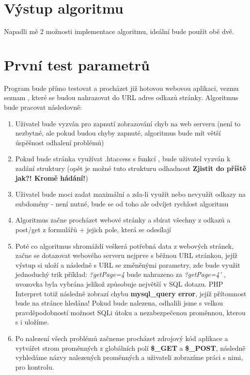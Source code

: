 \documentclass[12pt, a4paper]{report}
\begin{document}
\section{Výstup algoritmu}

Napadli mě 2 možnosti implementace algoritmu, ideální bude použít obě dvě.
\section{První test parametrů}
Program bude přímo testovat a procházet již hotovou webovou aplikaci, vezmu seznam , které se budou nahrazovat do URL adres odkazů stránky. Algoritmus bude pracovat následovně:
\begin{enumerate}
\item Uživatel bude vyzván pro zapnutí zobrazování chyb na web serveru (není to nezbytné, ale pokud budou chyby zapnuté, algoritmus bude mít větší úspěšnost odhalení problémů)
\item Pokud bude stránka využívat .htaccess s funkcí , bude uživatel vyzván k zadání struktury (opět je možné tuto strukturu odhadnout \textbf{Zjistit do příště jak?! Kromě hádání!})
\item Uživatel bude moci zadat maximální  a zda-li využít nebo nevyužít odkazy na subdomény - není nutné, bude se od toho ale odvíjet rychlost algoritmu
\item Algoritmus začne procházet webové stránky a sbírat všechny  z odkazů a post/get z formulářů + jejich pole, která se odesílají
\item Poté co algoritmus shromáždí veškerá potřebná data z webových stránek, začne se dotazovat webového serveru nejprve s běžnou URL stránkou, jejíž výstup si uloží a následně s URL se změněnými parametry, zde bude využit jednoduchý trik příklad: \emph{ ?getPage=4 } bude nahrazeno za \emph{ ?getPage=4\' }, uvozovka byla vybrána jelikož způsobuje největší  v SQL dotazu. PHP Interpret totiž následně zobrazí chybu \textbf{mysql\_query error}, jejíž přítomnost bude na stránce hledána! Pokud bude nalezena, odhalili jsme s velkou pravděpodobností možnost SQLi útoku a nezabezpečenou proměnnou, kterou s i uložíme.
\item Po nalezení všech problémů začneme procházet zdrojový kód aplikace a vytvářet strom proměnných z globálních polí \textbf{\$\_GET} a \textbf{\$\_POST}, následně vyhledáme názvy nalezených proměnných a uživateli zobrazíme práci s nimi, pro kontrolu.
\end{enumerate}
\end{document}
